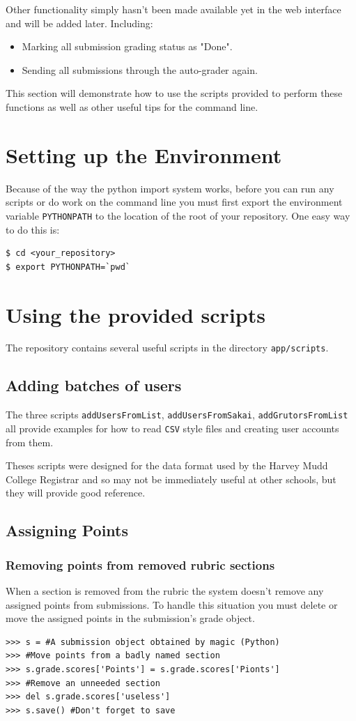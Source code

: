 \documentclass[11pt]{report}
\begin{document}
Other functionality simply hasn't been made available yet
in the web interface and will be added later. Including:
\begin{itemize}
  \item Marking all submission grading status as "Done".
  \item Sending all submissions through the auto-grader again.
\end{itemize}

This section will demonstrate how to use the scripts provided to perform these
functions as well as other useful tips for the command line.

\section{Setting up the Environment}
Because of the way the python import system works, before you can run any
scripts or do work on the command line you must first export the environment
variable \texttt{PYTHONPATH} to the location of the root of your repository.
One easy way to do this is:
\begin{verbatim}
$ cd <your_repository>
$ export PYTHONPATH=`pwd`
\end{verbatim}

\section{Using the provided scripts}
The repository contains several useful scripts in the directory
\texttt{app/scripts}.

\subsection{Adding batches of users}
The three scripts \texttt{addUsersFromList}, \texttt{addUsersFromSakai},
\texttt{addGrutorsFromList} all provide examples for how to read \texttt{CSV}
style files and creating user accounts from them.

Theses scripts were designed for the data format used by the Harvey Mudd
College Registrar and so may not be immediately useful at other schools, but
they will provide good reference.

\subsection{Assigning Points}
\label{sec:assigning_points}

\subsubsection{Removing points from removed rubric sections}
\label{sec:assigning_points:fixing_rubrics}
When a section is removed from the rubric the system doesn't remove any assigned points from submissions.
To handle this situation you must delete or move the assigned points in the submission's grade object.
\begin{verbatim}
>>> s = #A submission object obtained by magic (Python)
>>> #Move points from a badly named section
>>> s.grade.scores['Points'] = s.grade.scores['Pionts']
>>> #Remove an unneeded section
>>> del s.grade.scores['useless']
>>> s.save() #Don't forget to save
\end{verbatim}
\end{document}
